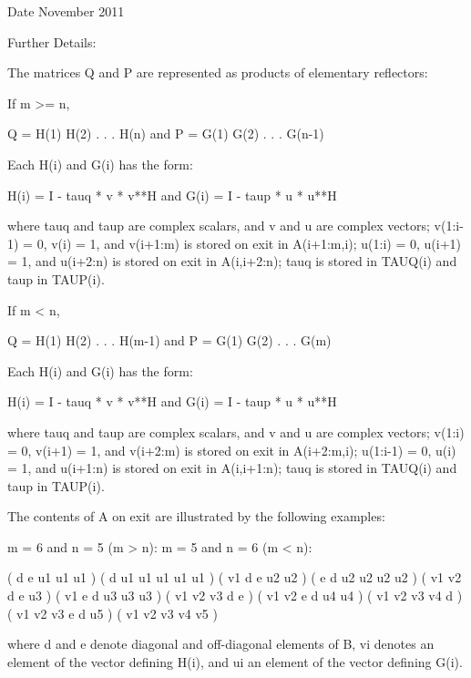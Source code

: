 \begin{DoxyDate}{Date}
November 2011 
\end{DoxyDate}
\begin{DoxyParagraph}{Further Details\+: }
\begin{DoxyVerb}  The matrices Q and P are represented as products of elementary
  reflectors:

  If m >= n,

     Q = H(1) H(2) . . . H(n)  and  P = G(1) G(2) . . . G(n-1)

  Each H(i) and G(i) has the form:

     H(i) = I - tauq * v * v**H  and G(i) = I - taup * u * u**H

  where tauq and taup are complex scalars, and v and u are complex
  vectors; v(1:i-1) = 0, v(i) = 1, and v(i+1:m) is stored on exit in
  A(i+1:m,i); u(1:i) = 0, u(i+1) = 1, and u(i+2:n) is stored on exit in
  A(i,i+2:n); tauq is stored in TAUQ(i) and taup in TAUP(i).

  If m < n,

     Q = H(1) H(2) . . . H(m-1)  and  P = G(1) G(2) . . . G(m)

  Each H(i) and G(i) has the form:

     H(i) = I - tauq * v * v**H  and G(i) = I - taup * u * u**H

  where tauq and taup are complex scalars, and v and u are complex
  vectors; v(1:i) = 0, v(i+1) = 1, and v(i+2:m) is stored on exit in
  A(i+2:m,i); u(1:i-1) = 0, u(i) = 1, and u(i+1:n) is stored on exit in
  A(i,i+1:n); tauq is stored in TAUQ(i) and taup in TAUP(i).

  The contents of A on exit are illustrated by the following examples:

  m = 6 and n = 5 (m > n):          m = 5 and n = 6 (m < n):

    (  d   e   u1  u1  u1 )           (  d   u1  u1  u1  u1  u1 )
    (  v1  d   e   u2  u2 )           (  e   d   u2  u2  u2  u2 )
    (  v1  v2  d   e   u3 )           (  v1  e   d   u3  u3  u3 )
    (  v1  v2  v3  d   e  )           (  v1  v2  e   d   u4  u4 )
    (  v1  v2  v3  v4  d  )           (  v1  v2  v3  e   d   u5 )
    (  v1  v2  v3  v4  v5 )

  where d and e denote diagonal and off-diagonal elements of B, vi
  denotes an element of the vector defining H(i), and ui an element of
  the vector defining G(i).\end{DoxyVerb}
 
\end{DoxyParagraph}
\hypertarget{group__complex16GEcomputational_gabe73145daeba3ec10e961054b75a07ce}{}
